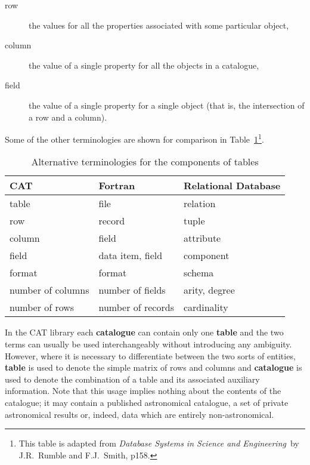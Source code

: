 \documentclass[11pt,twoside]{starlink}
\begin{document}
\begin{description}

  \item[row] the values for all the properties associated with some
   particular object,

  \item[column] the value of a single property for all the objects in
   a catalogue,

  \item[field] the value of a single property for a single object
   (that is, the intersection of a row and a column).

\end{description}

Some of the other terminologies are shown for comparison in
Table~\ref{TABLE_NOT}\footnote{This table is adapted from \textit{Database Systems in Science and Engineering}\, by J.R.~Rumble and
F.J.~Smith\cite{RUMBLE}, p158.}.

\begin{table}[htbp]

\begin{center}
\begin{tabular}{lll}
CAT               &  Fortran           &  Relational Database \\ \hline
table             &  file              &  relation      \\
row               &  record            &  tuple         \\
column            &  field             &  attribute     \\
field             &  data item, field  &  component     \\
format            &  format            &  schema        \\
number of columns &  number of fields  &  arity, degree \\
number of rows    &  number of records &  cardinality   \\
\end{tabular}
\end{center}

\caption{\label{TABLE_NOT}Alternative terminologies for the components of
tables}

\end{table}

In the CAT library each \textbf{catalogue} can contain only one \textbf{table} and the two terms can usually be used interchangeably without
introducing any ambiguity. However, where it is necessary to
differentiate between the two sorts of entities, \textbf{table} is used
to denote the simple matrix of rows and columns and \textbf{catalogue} is
used to denote the combination of a table and its associated auxiliary
information. Note that this usage implies nothing about the contents
of the catalogue; it may contain a published astronomical catalogue, a
set of private astronomical results or, indeed, data which are entirely
non-astronomical.
\end{document}
